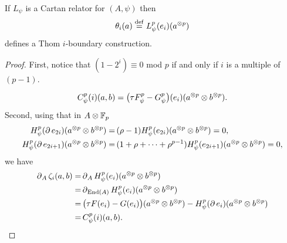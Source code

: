 \begin{theorem*}
	If $L_\psi$ is a Cartan relator for $(A, \psi)$ then
	\[
	\theta_i(a) \stackrel{\mathrm{def}}{=} L_\psi^p(e_i)(a^{\otimes p})
	\]
	defines a Thom $i$-boundary construction.
\end{theorem*}

\begin{proof}
	First, notice that $(1-2^i) \equiv 0$ mod $p$ if and only if $i$ is a multiple of $(p-1)$.


	\[
	C^p_\psi(i)(a,b) =
	\big(\tau F_\psi^p - G_\psi^p\big)(e_i)(a^{\otimes p} \otimes b^{\otimes p}).
	\]
	Second, using that in $A \otimes {\mathbb{F}_p}$
	\begin{align*}
		H_\psi^p(\operatorname{\partial} e_{2i})(a^{\otimes p} \otimes b^{\otimes p}) =&\,
		(\rho - 1) H_\psi^p(e_{2i})(a^{\otimes p} \otimes b^{\otimes p}) = 0, \\
		H_\psi^p(\operatorname{\partial} e_{2i+1})(a^{\otimes p} \otimes b^{\otimes p}) =&\,
		(1+\rho+\dots+\rho^{p-1}) H_\psi^p(e_{2i+1})(a^{\otimes p} \otimes b^{\otimes p}) = 0,
	\end{align*}
	we have
	\begin{align*}
		\operatorname{\partial}_A \zeta_i(a,b) =&
		\operatorname{\partial}_A H_\psi^p(e_i)(a^{\otimes p} \otimes b^{\otimes p}) \\ =&
		\operatorname{\partial}_{\mathrm{End}(A)} H_\psi^p(e_i)(a^{\otimes p} \otimes b^{\otimes p}) \\ =& \,
		\big(\tau F(e_i) - G(e_i)\big)(a^{\otimes p} \otimes b^{\otimes p}) -
		H_\psi^p(\operatorname{\partial} e_i)(a^{\otimes p} \otimes b^{\otimes p}) \\ =&\,
		C^p_\psi(i)(a,b).\qedhere
	\end{align*}
\end{proof}
